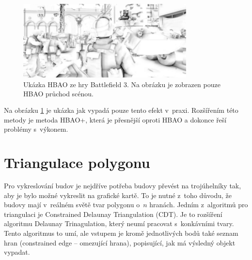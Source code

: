 \begin{figure}[H]
	\centering
	\includegraphics[width=24em]{images/ao/hbao.png}
	\caption[caption]{Ukázka HBAO ze hry Battlefield 3. Na obrázku je zobrazen pouze HBAO průchod scénou.\footnotemark} 
	\label{hbao_example}
\end{figure}

Na obrázku \ref{hbao_example} je ukázka jak vypadá pouze tento efekt v~praxi. Rozšířením této metody je metoda HBAO+, která je přesnější oproti HBAO a dokonce řeší problémy s~výkonem.

\section{Triangulace polygonu} \label{cdt-theory}
Pro vykreslování budov je nejdříve potřeba budovy převést na trojúhelníky tak, aby je bylo možné vykreslit na grafické kartě. To je nutné z~toho důvodu, že budovy mají v~reálném světě tvar polygonu o~$n$ hranách. Jedním z~algoritmů pro triangulaci je Constrained Delaunay Triangulation (CDT). Je to rozšíření algoritmu Delaunay Trinagulation, který neumí pracovat s~konkávními tvary. Tento algoritmus to umí, ale vstupem je kromě jednotlivých bodů také seznam hran (constrained edge -- omezující hrana), popisující, jak má výsledný objekt vypadat. 

